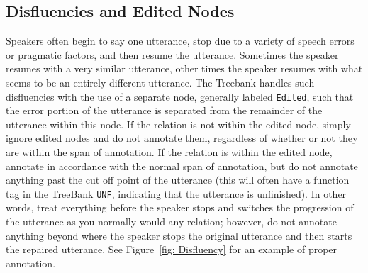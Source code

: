 \documentclass[11pt]{report}
\begin{document}
\subsection{Disfluencies and Edited Nodes}
Speakers often begin to say one utterance, stop due to a variety of speech errors or pragmatic factors, and then resume the utterance.  Sometimes the speaker resumes with a very similar utterance, other times the speaker resumes with what seems to be an entirely different utterance.  The Treebank handles such disfluencies with the use of a separate node, generally labeled \texttt{Edited}, such that the error portion of the utterance is separated from the remainder of the utterance within this node.  If the relation is not within the edited node, simply ignore edited nodes and do not annotate them, regardless of whether or not they are within the span of annotation.  If the relation is within the edited node, annotate in accordance with the normal span of annotation, but do not annotate anything past the cut off point of the utterance (this will often have a function tag in the TreeBank \texttt{UNF}, indicating that the utterance is unfinished).  In other words, treat everything before the speaker stops and switches the progression of the utterance as you normally would any relation; however, do not annotate anything beyond where the speaker stops the original utterance and then starts the repaired utterance.  See Figure~\ref{fig: Disfluency} for an example of proper annotation.  
\end{document}

